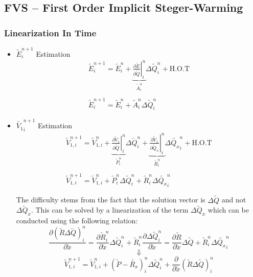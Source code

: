 \documentclass[11pt, a4paper]{article}
\newcommand{\parder}[2]{\frac{\partial {#1}}{\partial {#2}}}
\begin{document}
\subsection{FVS -- First Order Implicit Steger-Warming}

\subsubsection{Linearization In Time}
\begin{itemize}
    \item $\tilde{E}_i^{n+1}$ Estimation
        \begin{equation}
            \begin{array}{c}
                \displaystyle\tilde{E}_i^{n+1}=\tilde{E}_i^{n}+\underbrace{\left.\parder{\tilde{E}}{\tilde{Q}}\right|_i^n}_{\displaystyle\tilde{A}_i^n}\Delta\tilde{Q}_i^n+\mathrm{H.O.T} \\\\
                \displaystyle\tilde{E}_i^{n+1}=\tilde{E}_i^{n}+\tilde{A}_i^n\Delta\tilde{Q}_i^n
            \end{array}
        \end{equation}
    \item $\tilde{V_1}_{i}^{n+1}$ Estimation 
        \begin{equation}
            \begin{array}{c}
                \displaystyle\tilde{V}_{1,i}^{n+1}=\tilde{V}_{1,i}^{n}+\underbrace{\left.\parder{\tilde{V}_1}{\tilde{Q}}\right|_i^n}_{\displaystyle\tilde{P}_i^n}\Delta\tilde{Q}_i^n+\underbrace{\left.\parder{\tilde{V}_1}{\tilde{Q}_x}\right|_i^n}_{\displaystyle\tilde{R}_i^n}\Delta\tilde{Q_x}_i^n+\mathrm{H.O.T} \\\\
                \displaystyle\tilde{V}_{1,i}^{n+1}=\tilde{V}_{1,i}^{n}+\tilde{P}_i^n\Delta\tilde{Q}_i^n+\tilde{R}_i^n\Delta\tilde{Q_x}_i^n \\\\
            \end{array}
        \end{equation}
        The difficulty stems from the fact that the solution vector is $\Delta\tilde{Q}$ and not $\Delta\tilde{Q}_x$. This can be solved by a linearization of the term $\Delta\tilde{Q}_x$ which can be conducted using the following relation:
        \begin{equation*}
            \parder{\left(\tilde{R}\Delta\tilde{Q}\right)_i^n}{\tilde{x}}=\parder{\tilde{R}_i^n}{\tilde{x}}\Delta\tilde{Q}_i^n+\tilde{R}_i^n\parder{\Delta\tilde{Q}_i^n}{\tilde{x}}=\parder{\tilde{R}}{\tilde{x}}\Delta\tilde{Q}+\tilde{R}_i^n\Delta\tilde{Q_x}_i^n 
        \end{equation*}
        $$\Downarrow$$
        \begin{equation}
            \displaystyle\tilde{V}_{1,i}^{n+1}=\tilde{V}_{1,i}^{n}+\left(\tilde{P}-\tilde{R_x}\right)_i^n\Delta\tilde{Q}_i^n+\parder{}{\tilde{x}}\left(\tilde{R}\Delta\tilde{Q}\right)_i^n 
        \end{equation}
\end{itemize}
\end{document}
